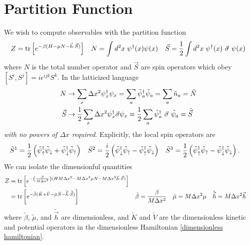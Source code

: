 \section{Partition Function}

We wish to compute observables with the partition function
\begin{align}
	Z
	&=
	\text{tr}\left[e^{-\beta(H-\mu N - \vec{h}\cdot\vec{S})}\right]
	&
	N &= \int d^2x\; \psi{}^{\dagger}(x)\psi(x)
	&
	\vec{S} = \frac{1}{2} \int d^2x\; \psi{}^{\dagger}(x) ~ \vec{\sigma} ~ \psi(x)
\end{align}
where $N$ is the total number operator and $\vec{S}$ are spin operators which obey $[S^i, S^j] = i\epsilon^{ijk} S^k$.
In the latticized language 
\begin{align}
	N
	&\rightarrow
	\sum_x \Delta x^2 \psi{}^{\dagger}_x \psi_x
	=
	\sum_a \tilde{\psi}{}^{\dagger}_a \tilde{\psi}_a
	=
	\sum_a \tilde{n}_a
	=
	\tilde{N}
	\\
	\vec{S}
	&\rightarrow
	\frac{1}{2} \sum_x \Delta x^2 \psi{}^{\dagger}_x \vec{\sigma} \psi_x
	=
	\frac{1}{2} \sum_a \tilde{\psi}{}^{\dagger}_a ~ \vec{\sigma} ~ \tilde{\psi}_a
	=
	\tilde{\vec{S}}
\end{align}
\emph{with no powers of $\Delta x$ required}.
Explicitly, the local spin operators are
\begin{align}
	\tilde{S}^1 &= \frac{1}{2} \left(\tilde{\psi}{}^{\dagger}_\uparrow \tilde{\psi}_\downarrow + \tilde{\psi}{}^{\dagger}_\downarrow \tilde{\psi}_\uparrow\right)
	&
	\tilde{S}^2 &= \frac{i}{2} \left( \tilde{\psi}{}^{\dagger}_\downarrow \tilde{\psi}_\uparrow - \tilde{\psi}{}^{\dagger}_\uparrow \tilde{\psi}_\downarrow\right)
	&
	\tilde{S}^3 &= \frac{1}{2} \left(\tilde{\psi}{}^{\dagger}_\uparrow \tilde{\psi}_\uparrow - \tilde{\psi}{}^{\dagger}_\downarrow \tilde{\psi}_\downarrow\right).
\end{align}
We can isolate the dimensionful quantities
\begin{align}
	Z
	&=
	\text{tr}\left[e^{-\left(\frac{\beta}{M\Delta x^2}\right)(HM\Delta x^2 -M \Delta x^2 \mu N - M \Delta x^2 \vec{h} \cdot \vec{S})}\right]
\\
	&=
	\text{tr}\left[e^{-\tilde{\beta}(\tilde{K}+\tilde{V}-\tilde{\mu} \tilde{N} - \tilde{\vec{h}}\cdot\tilde{\vec{S}})}\right]
	&
	\tilde{\beta} &= \frac{\beta}{M \Delta x^2}
	&
	\tilde{\mu}   &= M \Delta x^2 \mu
	&
	\tilde{\vec{h}} &= M \Delta x^2 \vec{h}
\end{align}
where $\tilde{\beta}$, $\tilde{\mu}$, and $\tilde{\vec{h}}$ are dimensionless, and $\tilde{K}$ and $\tilde{V}$ are the dimensionless kinetic and potential operators in the dimensionless Hamiltonian \eqref{dimensionless hamiltonian}.

